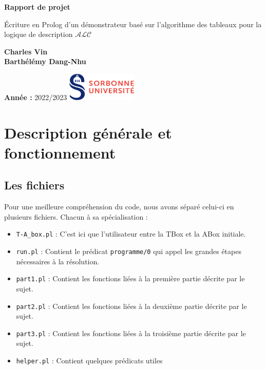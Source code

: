 \documentclass{article}
\begin{document}
\begin{titlepage}
    \begin{center}
        \vspace*{1cm}

        \Huge
        \textbf{Rapport de projet}

        \vspace{0.5cm}
        \LARGE
        Écriture en Prolog d'un démonstrateur basé sur l'algorithme des tableaux pour la logique de description  $ \mathcal{ALC}$

        \vspace{1.5cm}

        \textbf{Charles Vin}\\
        \textbf{Barthélémy Dang-Nhu}

        \vfill



        \normalsize

        \textbf{Année :}
        2022/2023
        \hfill
        \includegraphics[width=0.25\textwidth]{./src/logo.png}
    \end{center}
\end{titlepage}

\tableofcontents
\newpage

\section{Description générale et fonctionnement}
\subsection{Les fichiers}
Pour une meilleure compréhension du code, nous avons séparé celui-ci en plusieurs fichiers. Chacun à sa spécialisation : \begin{itemize}
    \item \verb|T-A_box.pl| : C'est ici que l'utilisateur entre la TBox et la ABox initiale.
    \item \verb|run.pl| : Contient le prédicat \verb|programme/0|  qui appel les grandes étapes nécessaires à la résolution.
    \item \verb|part1.pl| : Contient les fonctions liées à la première partie décrite par le sujet.
    \item \verb|part2.pl| : Contient les fonctions liées à la deuxième partie décrite par le sujet.
    \item \verb|part3.pl| : Contient les fonctions liées à la troisième partie décrite par le sujet.
    \item \verb|helper.pl| : Contient quelques prédicats utiles
\end{itemize}
\end{document}
